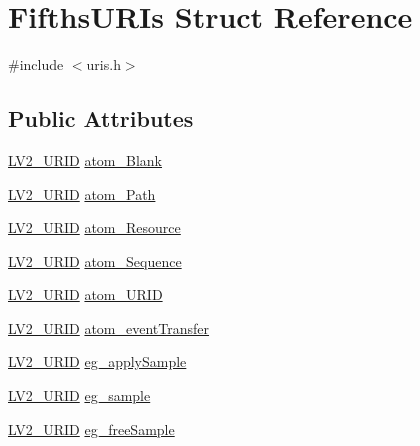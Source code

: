 \hypertarget{struct_fifths_u_r_is}{}\section{Fifths\+U\+R\+Is Struct Reference}
\label{struct_fifths_u_r_is}


{\ttfamily \#include $<$uris.\+h$>$}

\subsection*{Public Attributes}
\begin{DoxyCompactItemize}
\item 
\hyperlink{urid_8h_a5ff0630d245539e9f6dca10ff3c40fae}{L\+V2\+\_\+\+U\+R\+ID} \hyperlink{struct_fifths_u_r_is_a4fcce7dd3356a2a7510d813f616ab734}{atom\+\_\+\+Blank}
\item 
\hyperlink{urid_8h_a5ff0630d245539e9f6dca10ff3c40fae}{L\+V2\+\_\+\+U\+R\+ID} \hyperlink{struct_fifths_u_r_is_ad6af9d8d4af0e84f6dd8c5da0a159a9e}{atom\+\_\+\+Path}
\item 
\hyperlink{urid_8h_a5ff0630d245539e9f6dca10ff3c40fae}{L\+V2\+\_\+\+U\+R\+ID} \hyperlink{struct_fifths_u_r_is_a460e458ecd4cf8e0b803b4961a6d39ff}{atom\+\_\+\+Resource}
\item 
\hyperlink{urid_8h_a5ff0630d245539e9f6dca10ff3c40fae}{L\+V2\+\_\+\+U\+R\+ID} \hyperlink{struct_fifths_u_r_is_aaffe88999ccf6dbb1beff6c8d2ff2d56}{atom\+\_\+\+Sequence}
\item 
\hyperlink{urid_8h_a5ff0630d245539e9f6dca10ff3c40fae}{L\+V2\+\_\+\+U\+R\+ID} \hyperlink{struct_fifths_u_r_is_a11a2bc0174230fcdbbf6a39a8bfcda84}{atom\+\_\+\+U\+R\+ID}
\item 
\hyperlink{urid_8h_a5ff0630d245539e9f6dca10ff3c40fae}{L\+V2\+\_\+\+U\+R\+ID} \hyperlink{struct_fifths_u_r_is_aee856c74fe7f0bebbda5f66a710a51ec}{atom\+\_\+event\+Transfer}
\item 
\hyperlink{urid_8h_a5ff0630d245539e9f6dca10ff3c40fae}{L\+V2\+\_\+\+U\+R\+ID} \hyperlink{struct_fifths_u_r_is_aa39866369e2cc55f15eeef6952725811}{eg\+\_\+apply\+Sample}
\item 
\hyperlink{urid_8h_a5ff0630d245539e9f6dca10ff3c40fae}{L\+V2\+\_\+\+U\+R\+ID} \hyperlink{struct_fifths_u_r_is_ab5951e679060117b58ab7cff131f77eb}{eg\+\_\+sample}
\item 
\hyperlink{urid_8h_a5ff0630d245539e9f6dca10ff3c40fae}{L\+V2\+\_\+\+U\+R\+ID} \hyperlink{struct_fifths_u_r_is_a41a269c37faeff88c954d54e05188b45}{eg\+\_\+free\+Sample}

\end{DoxyCompactItemize}

